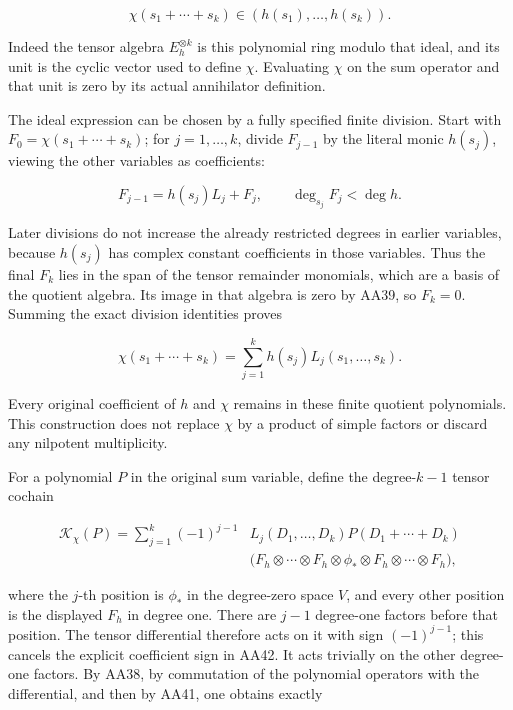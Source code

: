 \[
\chi(s_1+\cdots+s_k)\in(h(s_1),\ldots,h(s_k)).
\tag{AA39}
\]

Indeed the tensor algebra \(E_h^{\otimes k}\) is this polynomial ring modulo that ideal, and its unit is the cyclic vector used to define \(\chi\). Evaluating \(\chi\) on the sum operator and that unit is zero by its actual annihilator definition.

The ideal expression can be chosen by a fully specified finite division. Start with \(F_0=\chi(s_1+\cdots+s_k)\); for \(j=1,\ldots,k\), divide \(F_{j-1}\) by the literal monic \(h(s_j)\), viewing the other variables as coefficients:

\[
F_{j-1}=h(s_j)L_j+F_j,\qquad\deg_{s_j}F_j<\deg h.
\tag{AA40}
\]

Later divisions do not increase the already restricted degrees in earlier variables, because \(h(s_j)\) has complex constant coefficients in those variables. Thus the final \(F_k\) lies in the span of the tensor remainder monomials, which are a basis of the quotient algebra. Its image in that algebra is zero by AA39, so \(F_k=0\). Summing the exact division identities proves

\[
\chi(s_1+\cdots+s_k)=\sum_{j=1}^k h(s_j)L_j(s_1,\ldots,s_k).
\tag{AA41}
\]

Every original coefficient of \(h\) and \(\chi\) remains in these finite quotient polynomials. This construction does not replace \(\chi\) by a product of simple factors or discard any nilpotent multiplicity.

For a polynomial \(P\) in the original sum variable, define the degree-\(k-1\) tensor cochain

\[
\begin{aligned}
\mathcal K_\chi(P)=\sum_{j=1}^k(-1)^{j-1}
&L_j(D_1,\ldots,D_k)P(D_1+\cdots+D_k)\\
&\bigl(F_h\otimes\cdots\otimes F_h
\otimes\phi_*\otimes F_h\otimes\cdots\otimes F_h\bigr),
\end{aligned}
\tag{AA42}
\]

where the \(j\)-th position is \(\phi_*\) in the degree-zero space \(V\), and every other position is the displayed \(F_h\) in degree one. There are \(j-1\) degree-one factors before that position. The tensor differential therefore acts on it with sign \((-1)^{j-1}\); this cancels the explicit coefficient sign in AA42. It acts trivially on the other degree-one factors. By AA38, by commutation of the polynomial operators with the differential, and then by AA41, one obtains exactly

